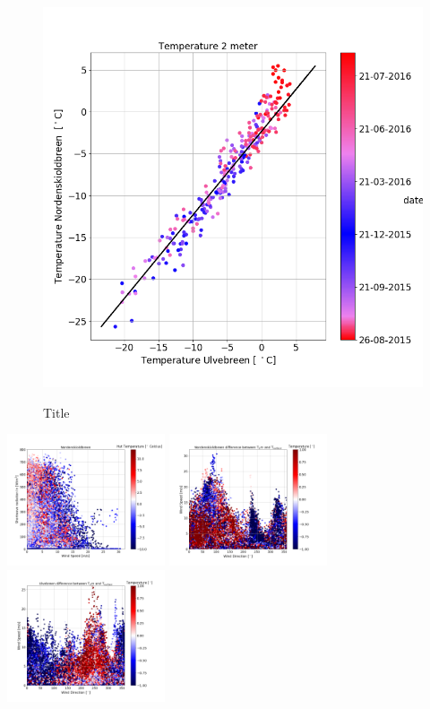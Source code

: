 \documentclass[11pt]{report}
\begin{document}
\begin{figure}[h]
\raggedright
\begin{minipage}{0.65\textwidth}
\raggedright
    \includegraphics[scale=1, width=1\textwidth]{T2mUlve-T2mNorde.png}	 
    \label{fig:labe}
    \caption{Title}
\end{minipage}%
\end{figure}


\includegraphics[scale=1, width=0.35\textwidth]{THUT-SIN-WS-Nordenskioldbreen.png}
\includegraphics[scale=1, width=0.35\textwidth]{THUT-T2m-WD-WS-Nordenskioldbreen.png}
\includegraphics[scale=1, width=0.35\textwidth]{THUT-T2m-WD-WS-Ulvebreen.png}
\end{document}
